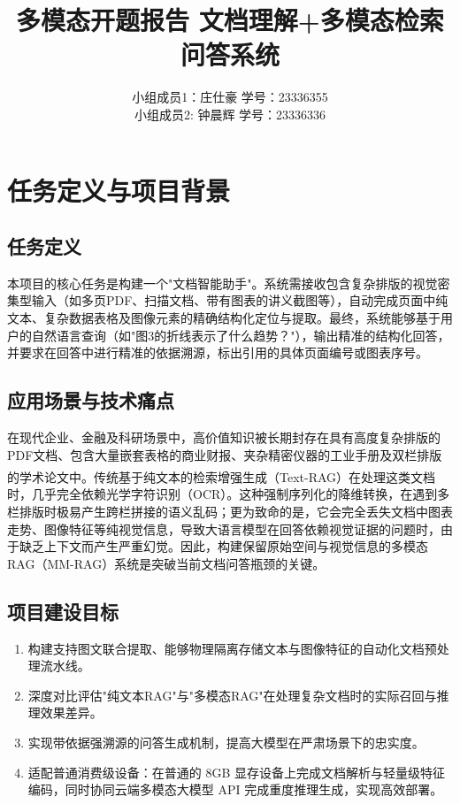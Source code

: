 ﻿\documentclass[UTF8, heading=true]{ctexart}
\title{\LARGE \textbf{多模态开题报告 \hspace{0.2cm} 文档理解+多模态检索问答系统}}
\date{}
\author{小组成员1：庄仕豪 \qquad 学号：23336355 \\ 小组成员2: 钟晨辉 \qquad 学号：23336336}
\newcommand{\upcite}[1]{\textsuperscript{\textsuperscript{\cite{#1}}}}
\begin{document}
\maketitle
\vspace{-1.5cm}

\section{任务定义与项目背景}

\subsection{任务定义}

本项目的核心任务是构建一个"文档智能助手"。系统需接收包含复杂排版的视觉密集型输入（如多页PDF、扫描文档、带有图表的讲义截图等），自动完成页面中纯文本、复杂数据表格及图像元素的精确结构化定位与提取。最终，系统能够基于用户的自然语言查询（如"图3的折线表示了什么趋势？"），输出精准的结构化回答，并要求在回答中进行精准的依据溯源，标出引用的具体页面编号或图表序号。

\subsection{应用场景与技术痛点}

在现代企业、金融及科研场景中，高价值知识被长期封存在具有高度复杂排版的PDF文档、包含大量嵌套表格的商业财报、夹杂精密仪器的工业手册及双栏排版的学术论文中\upcite{1}。传统基于纯文本的检索增强生成（Text-RAG）在处理这类文档时，几乎完全依赖光学字符识别（OCR）。这种强制序列化的降维转换，在遇到多栏排版时极易产生跨栏拼接的语义乱码；更为致命的是，它会完全丢失文档中图表走势、图像特征等纯视觉信息，导致大语言模型在回答依赖视觉证据的问题时，由于缺乏上下文而产生严重幻觉。因此，构建保留原始空间与视觉信息的多模态RAG（MM-RAG）系统是突破当前文档问答瓶颈的关键。

\subsection{项目建设目标}

\begin{enumerate}
    \item 构建支持图文联合提取、能够物理隔离存储文本与图像特征的自动化文档预处理流水线。
    \item 深度对比评估"纯文本RAG"与"多模态RAG"在处理复杂文档时的实际召回与推理效果差异。
    \item 实现带依据强溯源的问答生成机制，提高大模型在严肃场景下的忠实度。
    \item 适配普通消费级设备：在普通的 8GB 显存设备上完成文档解析与轻量级特征编码，同时协同云端多模态大模型 API 完成重度推理生成，实现高效部署。
\end{enumerate}
\end{document}
